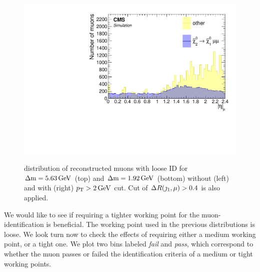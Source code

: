 \begin{figure}[!htb]
\includegraphics[width=0.48\linewidth]{plots/lepton_selection/lepton_selection_dm1p92/none_Muons_Eta_after_pt.pdf} \\
\caption[\abs{\eta} distribution of reconstructed muons with loose ID before and after $\pt>2\GeV$ cut]{ \abs{\eta} distribution of reconstructed muons with loose ID for $\Delta\mathrm{m}=5.63\,\text{Ge\hspace{-.08em}V}$ (top) and $\Delta\mathrm{m}=1.92\,\text{Ge\hspace{-.08em}V}$ (bottom) without (left) and with (right) $\pt>2\GeV$ cut. Cut of $\Delta R(\jmath_1,\mu)>0.4$ is also applied.}
\label{fig:muons-selection-eta}
\end{figure}

We would like to see if requiring a tighter working point for the muon-identification is beneficial. The working point used in the previous distributions is loose. We look turn now to check the effects of requiring either a medium working point, or a tight one. We plot two bins labeled \emph{fail} and \emph{pass}, which correspond to whether the muon passes or failed the identification criteria of a medium or tight working points.

